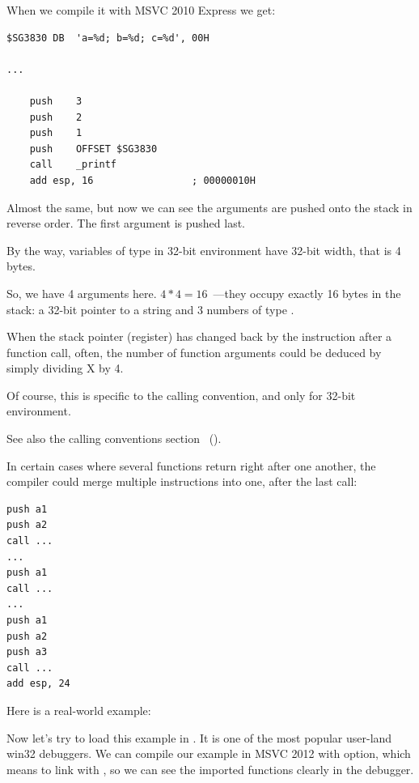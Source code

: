 

When we compile it with MSVC 2010 Express we get:

\begin{lstlisting}
$SG3830	DB	'a=%d; b=%d; c=%d', 00H

...

	push	3
	push	2
	push	1
	push	OFFSET $SG3830
	call	_printf
	add	esp, 16					; 00000010H
\end{lstlisting}

Almost the same, but now we can see the \printf arguments are pushed onto the stack in reverse order. The first argument is pushed last.

By the way, variables of \Tint type in 32-bit environment have 32-bit width, that is 4 bytes.

So, we have 4 arguments here. $4*4 = 16$~---they occupy exactly 16 bytes in the stack: a 32-bit pointer to a string and 3 numbers of type \Tint.

When the \gls{stack pointer} (\ESP register) has changed back by the 
instruction after a function 
call, often, the number of function arguments could be deduced by simply dividing X by 4.

Of course, this is specific to the  calling convention, and only for 32-bit environment.

See also the calling conventions section ~().

In certain cases where several functions return right after one another, the compiler could merge multiple  instructions into one, after the last call:

\begin{lstlisting}
push a1
push a2
call ...
...
push a1
call ...
...
push a1
push a2
push a3
call ...
add esp, 24
\end{lstlisting}

Here is a real-world example:



\clearpage
{}
\myindex{\olly}

Now let's try to load this example in \olly.
It is one of the most popular user-land win32 debuggers.
We can compile our example in MSVC 2012 with  option, which means to link with ,
so we can see the imported functions clearly in the debugger.


